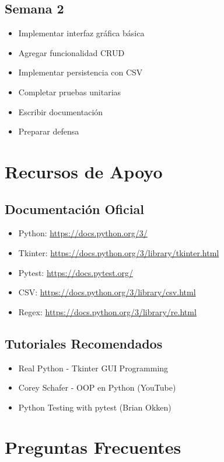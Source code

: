 \documentclass[12pt,a4paper]{article}
\begin{document}
\subsection{Semana 2}
\begin{itemize}[leftmargin=*]
    \item Implementar interfaz gráfica básica
    \item Agregar funcionalidad CRUD
    \item Implementar persistencia con CSV
    \item Completar pruebas unitarias
    \item Escribir documentación
    \item Preparar defensa
\end{itemize}

\section{Recursos de Apoyo}

\subsection{Documentación Oficial}
\begin{itemize}[leftmargin=*]
    \item Python: \url{https://docs.python.org/3/}
    \item Tkinter: \url{https://docs.python.org/3/library/tkinter.html}
    \item Pytest: \url{https://docs.pytest.org/}
    \item CSV: \url{https://docs.python.org/3/library/csv.html}
    \item Regex: \url{https://docs.python.org/3/library/re.html}
\end{itemize}

\subsection{Tutoriales Recomendados}
\begin{itemize}[leftmargin=*]
    \item Real Python - Tkinter GUI Programming
    \item Corey Schafer - OOP en Python (YouTube)
    \item Python Testing with pytest (Brian Okken)
\end{itemize}

\section{Preguntas Frecuentes}
\end{document}
